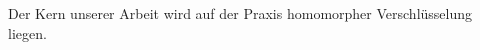 \label{sec:kern}
    Der Kern unserer Arbeit wird auf der Praxis homomorpher Verschlüsselung liegen.